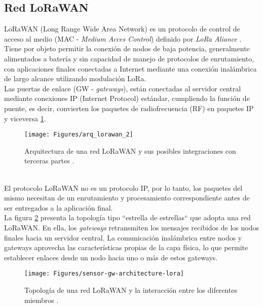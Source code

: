 \subsection{Red LoRaWAN}
LoRaWAN (Long Range Wide Area Network) es un protocolo de control de acceso al medio (MAC - \textit{Medium Acces Control}) definido por \textit{LoRa Aliance} \citep{lora_alliance}. Tiene por objeto permitir la conexión de nodos de baja potencia, generalmente alimentados a batería y sin capacidad de manejo de protocolos de enrutamiento, con aplicaciones finales conectadas a Internet mediante una conexión inalámbrica de largo alcance utilizando modulación LoRa.\\
Las puertas de enlace (GW - \textit{gateways}), están conectadas al servidor central mediante conexiones IP (Internet Protocol) estándar, cumpliendo la función de puente, es decir, convierten los paquetes de radiofrecuencia (RF) en paquetes IP y viceversa \ref{fig:arqlorawan}.\\
\begin{figure}[h!]
	\centering
	\texttt{[image: Figures/arq\_lorawan\_2]}
	\caption{Arquitectura de una red LoRaWAN y sus posibles integraciones con terceras partes \citep{lora_alliance}.}
	\label{fig:arqlorawan}
\end{figure}\\
El protocolo LoRaWAN no es un protocolo IP, por lo tanto, los paquetes del mismo necesitan de un enrutamiento y procesamiento correspondiente antes de ser entregados a la aplicación final.\\
La figura \ref{fig:sensor-gw-architecture-lora} presenta la topología tipo ``estrella de estrellas`` que adopta una red LoRaWAN. En ella, los \textit{gateways} retransmiten los mensajes recibidos de los nodos finales hacia un servidor central. La comunicación inalámbrica entre nodos y gateways aprovecha las características propias de la capa física, lo que permite establecer enlaces desde un nodo hacia uno o más de estos gateways.\\
\begin{figure}[h]
	\centering
	\texttt{[image: Figures/sensor-gw-architecture-lora]}
	\caption{Topología de una red LoRaWAN y la interacción entre los diferentes miembros \citep{lora_alliance}.}
	\label{fig:sensor-gw-architecture-lora}
\end{figure}

